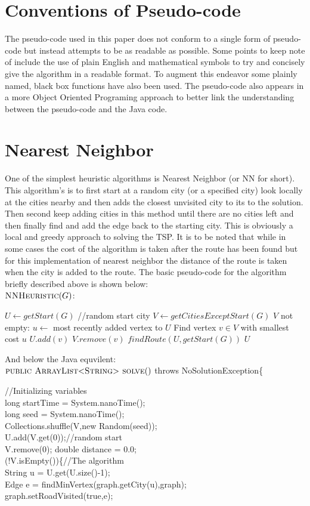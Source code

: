 \documentclass[midd]{thesis}
\newcommand{\tab}{\hspace*{2em}}
\begin{document}
\section{Conventions of Pseudo-code}
\tab The pseudo-code used in this paper does not conform to a single form of pseudo-code but instead attempts to be as readable as possible. Some points to keep note of include the use of plain English and mathematical symbols to try and concisely give the algorithm in a readable format. To augment this endeavor some plainly named, black box functions have also been used. The pseudo-code also appears in a more Object Oriented Programing approach to better link the understanding between the pseudo-code and the Java code.
\section{Nearest Neighbor}
\tab One of the simplest heuristic algorithms is Nearest Neighbor (or NN for short). This algorithm's is to first start at a random city (or a specified city) look locally at the cities nearby and then adds the closest unvisited city to its to the solution. Then second keep adding cities in this method until there are no cities left and then finally find and add the edge back to the starting city. This is obviously a local and greedy approach to solving the TSP. It is to be noted that while in some cases the cost of the algorithm is taken after the route has been found but for this implementation of nearest neighbor the distance of the route is taken when the city is added to the route. The basic pseudo-code for the algorithm briefly described above is shown below:\\
$\textnormal{\scshape NNHeuristic}(G)$:
\begin{codebox}
\li $U \gets getStart(G)$ //random start city
\li $V \gets getCitiesExceptStart(G)$
\li\While $V$ not empty:
\li $u \gets$ most recently added vertex to $U$
\li Find vertex $v \in V$ with smallest cost $u$
\li $U.add(v)$
\li $V.remove(v)$\End
\li $findRoute(U, getStart(G))$
\li\Return $U$
\end{codebox}
And below the Java equvilent:\\
$\textnormal{\scshape public ArrayList$<$String$>$ solve}()$ throws NoSolutionException\{
\begin{codebox}
\tab//Initializing variables\\
\tab long startTime = System.nanoTime();\\
\tab long seed = System.nanoTime();\\
\tab Collections.shuffle(V,new Random(seed));\\
\tab U.add(V.get(0));//random start\\
\tab V.remove(0); double distance = 0.0;\\
\tab\While(!V.isEmpty())\{//The algorithm\\
\tab\tab String u = U.get(U.size()-1);\\
\tab\tab Edge e = findMinVertex(graph.getCity(u),graph);\\
\tab\tab graph.setRoadVisited(true,e);\\
\end{codebox}
\end{document}
